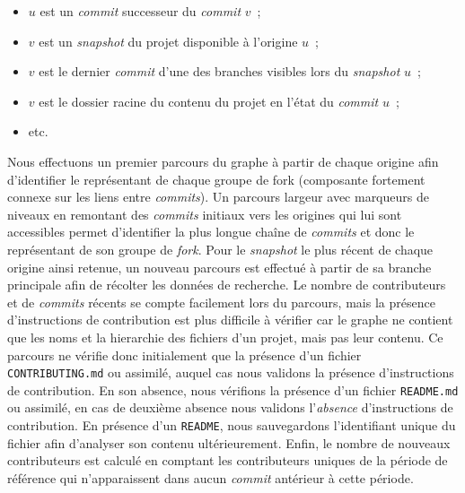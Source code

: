 \documentclass[dvipsnames,runningheads]{llncs}
\newcommand{\en}[1]{\foreignlanguage{english}{\emph{#1}}}
\begin{document}
    \begin{itemize}
        \item $u$ est un \en{commit} successeur du \en{commit} $v$ ;
        \item $v$ est un \en{snapshot} du projet disponible à l'origine $u$ ;
        \item $v$ est le dernier \en{commit} d'une des branches visibles lors du \en{snapshot} $u$ ;
        \item $v$ est le dossier racine du contenu du projet en l'état du \en{commit} $u$ ;
        \item etc.
    \end{itemize}

    Nous effectuons un premier parcours du graphe à partir de chaque origine afin d'identifier le représentant
    de chaque groupe de fork (composante fortement connexe sur les liens entre \en{commits}). Un parcours
    largeur avec marqueurs de niveaux en remontant des \en{commits} initiaux vers les origines qui lui sont
    accessibles permet d'identifier la plus longue chaîne de \en{commits} et donc le représentant de son
    groupe de \en{fork}. Pour le \en{snapshot} le plus récent de chaque origine ainsi retenue, un nouveau
    parcours est effectué à partir de sa branche principale afin de récolter les données de recherche. Le
    nombre de contributeurs et de \en{commits} récents se compte facilement lors du parcours, mais la présence
    d'instructions de contribution est plus difficile à vérifier car le graphe ne contient que les noms et la
    hierarchie des fichiers d'un projet, mais pas leur contenu. Ce parcours ne vérifie donc initialement que
    la présence d'un fichier \texttt{CONTRIBUTING.md} ou assimilé, auquel cas nous validons la présence
    d'instructions de contribution. En son absence, nous vérifions la présence d'un fichier \texttt{README.md}
    ou assimilé, en cas de deuxième absence nous validons l'\emph{absence} d'instructions de contribution. En
    présence d'un \texttt{README}, nous sauvegardons l'identifiant unique du fichier afin d'analyser son
    contenu ultérieurement. Enfin, le nombre de nouveaux contributeurs est calculé en comptant les
    contributeurs uniques de la période de référence qui n'apparaissent dans aucun \en{commit} antérieur à
    cette période.
\end{document}

